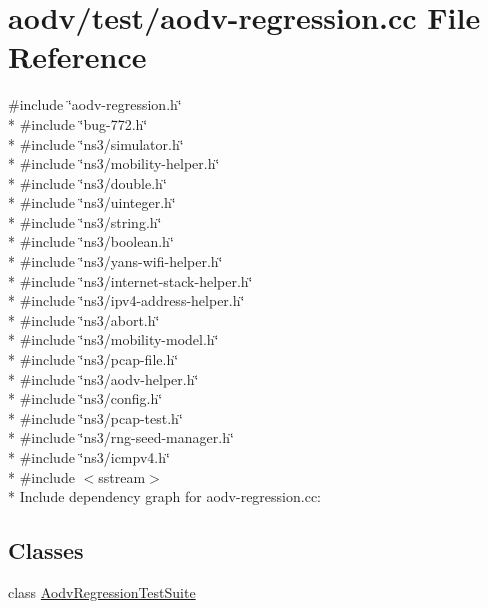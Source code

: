 \hypertarget{aodv-regression_8cc}{}\section{aodv/test/aodv-\/regression.cc File Reference}
\label{aodv-regression_8cc}
{\ttfamily \#include \char`\"{}aodv-\/regression.\+h\char`\"{}}\\*
{\ttfamily \#include \char`\"{}bug-\/772.\+h\char`\"{}}\\*
{\ttfamily \#include \char`\"{}ns3/simulator.\+h\char`\"{}}\\*
{\ttfamily \#include \char`\"{}ns3/mobility-\/helper.\+h\char`\"{}}\\*
{\ttfamily \#include \char`\"{}ns3/double.\+h\char`\"{}}\\*
{\ttfamily \#include \char`\"{}ns3/uinteger.\+h\char`\"{}}\\*
{\ttfamily \#include \char`\"{}ns3/string.\+h\char`\"{}}\\*
{\ttfamily \#include \char`\"{}ns3/boolean.\+h\char`\"{}}\\*
{\ttfamily \#include \char`\"{}ns3/yans-\/wifi-\/helper.\+h\char`\"{}}\\*
{\ttfamily \#include \char`\"{}ns3/internet-\/stack-\/helper.\+h\char`\"{}}\\*
{\ttfamily \#include \char`\"{}ns3/ipv4-\/address-\/helper.\+h\char`\"{}}\\*
{\ttfamily \#include \char`\"{}ns3/abort.\+h\char`\"{}}\\*
{\ttfamily \#include \char`\"{}ns3/mobility-\/model.\+h\char`\"{}}\\*
{\ttfamily \#include \char`\"{}ns3/pcap-\/file.\+h\char`\"{}}\\*
{\ttfamily \#include \char`\"{}ns3/aodv-\/helper.\+h\char`\"{}}\\*
{\ttfamily \#include \char`\"{}ns3/config.\+h\char`\"{}}\\*
{\ttfamily \#include \char`\"{}ns3/pcap-\/test.\+h\char`\"{}}\\*
{\ttfamily \#include \char`\"{}ns3/rng-\/seed-\/manager.\+h\char`\"{}}\\*
{\ttfamily \#include \char`\"{}ns3/icmpv4.\+h\char`\"{}}\\*
{\ttfamily \#include $<$sstream$>$}\\*
Include dependency graph for aodv-\/regression.cc\+:
\subsection*{Classes}
\begin{DoxyCompactItemize}
\item 
class \hyperlink{classAodvRegressionTestSuite}{Aodv\+Regression\+Test\+Suite}
\end{DoxyCompactItemize}
